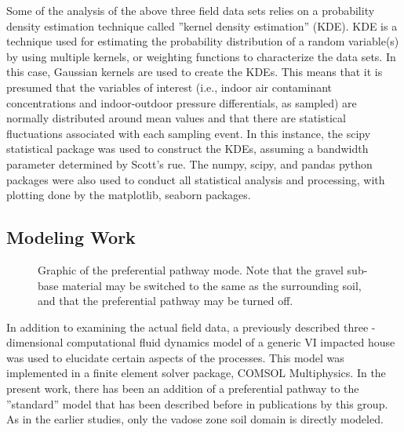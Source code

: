 \documentclass[journal=esthag,manuscript=article]{achemso}
\begin{document}
Some of the analysis of the above three field data sets relies on a probability density estimation technique called ”kernel density estimation” (KDE).
KDE is a technique used for estimating the probability distribution of a random variable(s) by using multiple kernels, or weighting functions to characterize the data sets.
In this case, Gaussian kernels are used to create the KDEs.
This means that it is presumed that the variables of interest (i.e., indoor air contaminant concentrations and indoor-outdoor pressure differentials, as sampled) are normally distributed around mean values and that there are statistical fluctuations associated with each sampling event.
In this instance, the scipy statistical package was used to construct the KDEs, assuming a bandwidth parameter determined by Scott’s rue.
The numpy, scipy, and pandas python packages were also used to conduct all statistical analysis and processing, with plotting done by the matplotlib, seaborn packages. %


\subsection{Modeling Work}

\begin{figure}[htb!]
  \caption{Graphic of the preferential pathway mode. Note that the gravel sub-base material may be switched to the same as the surrounding soil, and that the preferential pathway may be turned off.}\label{fig:model}
\end{figure}

In addition to examining the actual field data, a previously described three -dimensional computational fluid dynamics model of a generic VI impacted house was used to elucidate certain aspects of  the processes.
This model was implemented in a finite element solver package, COMSOL Multiphysics.
In the present work, there has been an addition of a preferential pathway to the ”standard” model that has been described before in publications by this group\cite{shen_influence_2013,yao_investigating_2017,yao_three-dimensional_2017}.
As in the earlier studies, only the vadose zone soil domain is directly modeled.
\end{document}
